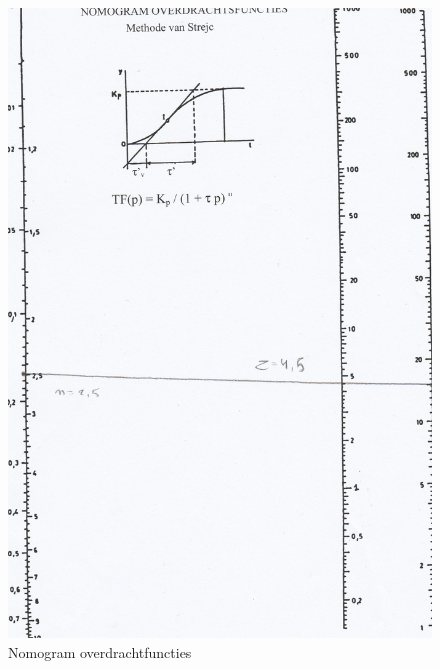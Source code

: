 \documentclass[a4paper, 12pt]{article}
\begin{document}
\begin{figure}[H]
	\includegraphics[width=1\linewidth]{Labo2_1.jpg}
	\caption{Nomogram overdrachtfuncties}
	\label{fig:fig2_1}
\end{figure}
\end{document}
